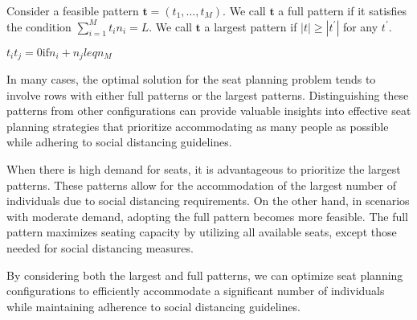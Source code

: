 \begin{definition}
Consider a feasible pattern $\bm{t} = (t_1, \ldots, t_M)$. 
We call $\bm{t}$ a full pattern if it satisfies the condition $\sum_{i=1}^{M} t_i n_i = L$. We call $\bm{t}$ a largest pattern if 
$|t| \geq |t^{\prime}|$ for any $t^{\prime}$.

$t_i t_j = 0 \text{if} n_i + n_j leq n_M$




\end{definition}

In many cases, the optimal solution for the seat planning problem tends to involve rows with either full patterns or the largest patterns. Distinguishing these patterns from other configurations can provide valuable insights into effective seat planning strategies that prioritize accommodating as many people as possible while adhering to social distancing guidelines.

When there is high demand for seats, it is advantageous to prioritize the largest patterns. These patterns allow for the accommodation of the largest number of individuals due to social distancing requirements. On the other hand, in scenarios with moderate demand, adopting the full pattern becomes more feasible. The full pattern maximizes seating capacity by utilizing all available seats, except those needed for social distancing measures.

By considering both the largest and full patterns, we can optimize seat planning configurations to efficiently accommodate a significant number of individuals while maintaining adherence to social distancing guidelines. 


